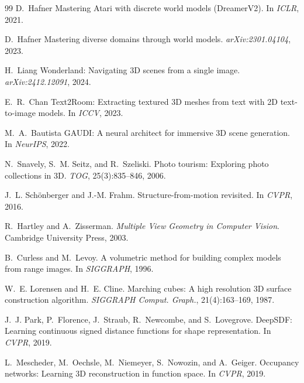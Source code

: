 \begin{thebibliography}{99}
D.~Hafner \etal
Mastering {Atari} with discrete world models ({DreamerV2}).
In \emph{ICLR}, 2021.


D.~Hafner \etal
Mastering diverse domains through world models.
\emph{arXiv:2301.04104}, 2023.



H.~Liang \etal
{Wonderland}: Navigating 3{D} scenes from a single image.
\emph{arXiv:2412.12091}, 2024.


E.~R.~Chan \etal
{Text2Room}: Extracting textured 3{D} meshes from text with 2{D}
text-to-image models.
In \emph{ICCV}, 2023.


M.~A.~Bautista \etal
{GAUDI}: A neural architect for immersive 3{D} scene generation.
In \emph{NeurIPS}, 2022.


N.~Snavely, S.~M. Seitz, and R.~Szeliski.
Photo tourism: Exploring photo collections in 3{D}.
\emph{TOG}, 25(3):835--846, 2006.


J.~L. Sch{\"o}nberger and J.-M. Frahm.
Structure-from-motion revisited.
In \emph{CVPR}, 2016.


R.~Hartley and A.~Zisserman.
\emph{Multiple View Geometry in Computer Vision}.
Cambridge University Press, 2003.


B.~Curless and M.~Levoy.
A volumetric method for building complex models from range images.
In \emph{SIGGRAPH}, 1996.


W.~E. Lorensen and H.~E. Cline.
Marching cubes: A high resolution 3{D} surface construction algorithm.
\emph{SIGGRAPH Comput. Graph.}, 21(4):163--169, 1987.


J.~J. Park, P.~Florence, J.~Straub, R.~Newcombe, and S.~Lovegrove.
{DeepSDF}: Learning continuous signed distance functions for shape
representation.
In \emph{CVPR}, 2019.


L.~Mescheder, M.~Oechsle, M.~Niemeyer, S.~Nowozin, and A.~Geiger.
Occupancy networks: Learning 3{D} reconstruction in function space.
In \emph{CVPR}, 2019.



\end{thebibliography}

